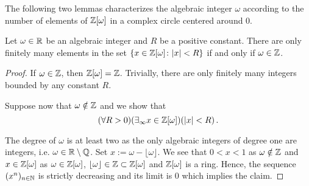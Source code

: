 The following two lemmas characterizes the algebraic integer $\omega$ according to the number of elements of $\mathbb{Z}[\omega]$ in a complex circle centered around 0. 
\begin{lem}
Let $\omega\in\mathbb{R}$ be an algebraic integer and $R$ be a positive constant. There are only finitely many elements in the set $\left\{x \in\mathbb{Z}[\omega] \colon |x|<R \right\}$ if and only if $\omega \in \mathbb{Z}$. 
\end{lem}
\begin{proof}
If $\omega \in \mathbb{Z}$, then $\mathbb{Z}[\omega] = \mathbb{Z}$. Trivially, there are only finitely many integers bounded by any constant $R$.

Suppose now that $\omega \notin \mathbb{Z}$ and we show that 
$$
(\forall R>0) (\exists_\infty x\in \mathbb{Z}[\omega])(|x|<R)\,.
$$ 

The degree of $\omega$ is at least two as the only algebraic integers of degree one are integers, i.e. $\omega \in \mathbb{R} \setminus \mathbb{Q}$. 
Set $x:= \omega- \lfloor \omega \rfloor$. We see that $0<x<1$ as $\omega \notin \mathbb{Z}$ and $x \in \mathbb{Z}[\omega]$ as $\omega \in \mathbb{Z}[\omega]$, $\lfloor \omega \rfloor \in  \mathbb{Z}\subset\mathbb{Z}[\omega]$ and $\mathbb{Z}[\omega]$ is a ring. 
Hence, the sequence $(x^n)_{n\in \mathbb{N}}$ is strictly decreasing and its limit is 0 which implies the claim.
\end{proof}


